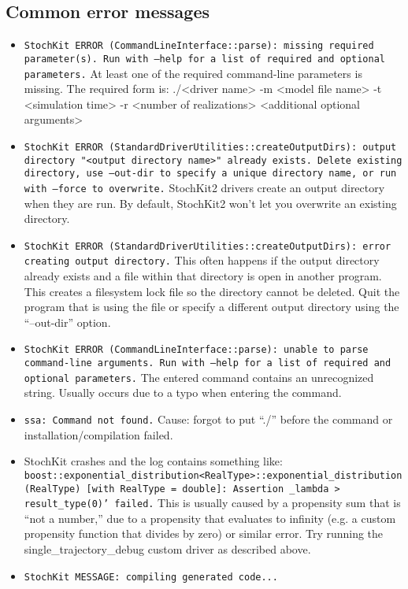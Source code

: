 \documentclass[11pt,letterpaper]{article}
\begin{document}
\subsection{Common error messages}
\begin{itemize}
    \item \texttt{StochKit ERROR (CommandLineInterface::parse): missing required parameter(s).  Run with --help for a list of required and optional parameters.}
At least one of the required command-line parameters is missing.  The required form is: ./<driver name> -m <model file name> -t <simulation time> -r <number of realizations> <additional optional arguments>
    \item \texttt{StochKit ERROR (StandardDriverUtilities::createOutputDirs): output directory "<output directory name>" already exists. Delete existing directory, use --out-dir to specify a unique directory name, or run with --force to overwrite.}
StochKit2 drivers create an output directory when they are run.  By default, StochKit2 won’t let you overwrite an existing directory.
    \item \texttt{StochKit ERROR (StandardDriverUtilities::createOutputDirs): error creating output directory.}
This often happens if the output directory already exists and a file within that directory is open in another program.  This creates a filesystem lock file so the directory cannot be deleted.  Quit the program that is using the file or specify a different output directory using the ``--out-dir'' option.
    \item \texttt{StochKit ERROR (CommandLineInterface::parse): unable to parse command-line arguments.  Run with --help for a list of required and optional parameters.}
The entered command contains an unrecognized string.  Usually occurs due to a typo when entering the command.
\item \texttt{ssa: Command not found.} Cause: forgot to put ``./'' before the command or installation/compilation failed.
\item StochKit crashes and the log contains something like: \texttt{boost::exponential\_distribution<RealType>::exponential\_distribution(RealType) [with RealType = double]: Assertion \_lambda > result\_type(0)' failed.}  This is usually caused by a propensity sum that is ``not a number,'' due to a propensity that evaluates to infinity (e.g. a custom propensity function that divides by zero) or similar error.  Try running the single\_trajectory\_debug custom driver as described above.
    \item \texttt{StochKit MESSAGE: compiling generated code...
}
\end{itemize}
\end{document}
